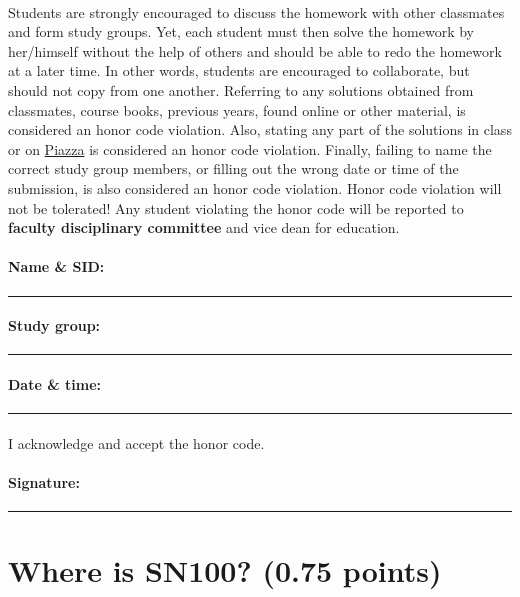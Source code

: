 \documentclass[11pt,a4paper]{article}
\newcommand{\totals}[1]{({\color{magenta}#1 points})}
\begin{document}
\paragraph{} Students are strongly encouraged to discuss the homework with other classmates and form study groups. Yet, each student must then solve the homework by her/himself without the help of others and should be able to redo the homework at a later time. In other words, students are encouraged to collaborate, but should not copy from one another. Referring to any solutions obtained from classmates, course books, previous years, found online or other material, is considered an honor code violation. Also, stating any part of the solutions in class or on \href{https://piazza.com/class/kkn1oz577n2sq}{Piazza} is considered an honor code violation. Finally, failing to name the correct study group members, or filling out the wrong date or time of the submission, is also considered an honor code violation. Honor code violation will not be tolerated! Any student violating the honor code will be reported to {\bf\color{LimeGreen} faculty disciplinary committee} and vice dean for education.

\vspace*{0.15in}
\paragraph{Name \& SID:} \rule{4.5in}{0.5pt}
\paragraph{Study group:} \rule{4.5in}{0.5pt}
\paragraph{Date \& time:} \rule{2.5in}{0.5pt}
\paragraph{} I acknowledge and accept the honor code.
\paragraph{Signature:} \rule{2.5in}{0.5pt}

\pagebreak

\section{Where is SN100? \totals{0.75}}
\end{document}
